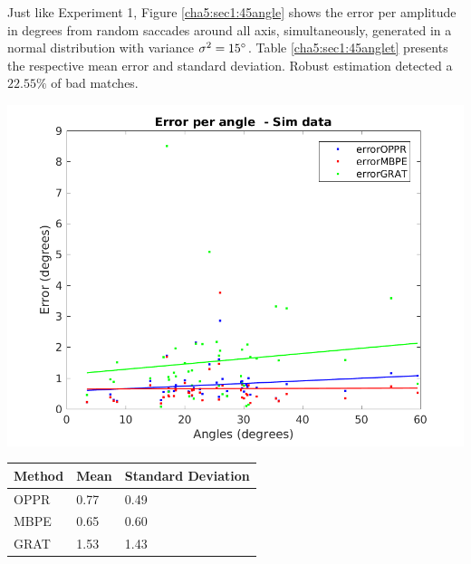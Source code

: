 Just like Experiment 1, Figure \ref{cha5:sec1:45angle} shows the error per  amplitude in degrees from random saccades around all axis, simultaneously, generated in a normal distribution with variance $\sigma^2 = 15 \degree $. Table \ref{cha5:sec1:45anglet} presents the respective mean error and standard deviation. Robust estimation detected a $ 22.55 \%$ of bad matches.

\begin{minipage}{0.5\textwidth}
	\centering
	\includegraphics[width=\textwidth]{images/sim/45angle.png}
	\label{cha5:sec1:45angle}
\end{minipage}
\begin{minipage}{0.5\textwidth}
	\centering
	\begin{tabular}{| l | l | l |}
		\hline
		Method & Mean & Standard Deviation \\
		\hline
		OPPR &  0.77 \degree & 0.49 \degree \\
		\hline
		MBPE &  0.65 \degree & 0.60 \degree \\
		\hline
		GRAT &  1.53 \degree & 1.43 \degree \\ 
		\hline
	\end{tabular}
	\label{cha5:sec1:45anglet}
\end{minipage}\\

